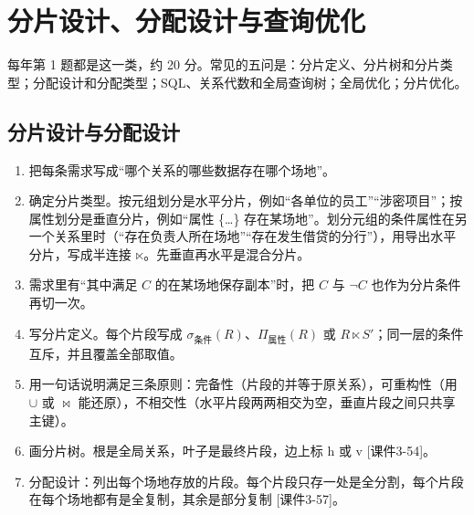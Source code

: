 \documentclass[10pt,a4paper]{article}
\newcommand{\sj}{\ltimes}
\newcommand{\jn}{\bowtie}
\newcommand{\sel}[1]{\sigma_{\text{#1}}}
\newcommand{\proj}[1]{\Pi_{\text{#1}}}
\newcommand{\kj}[1]{\textsf{\small[课件#1]}}
\begin{document}
\clearpage
\section{分片设计、分配设计与查询优化}
{\small 每年第 1 题都是这一类，约 20 分。常见的五问是：分片定义、分片树和分片类型；分配设计和分配类型；SQL、关系代数和全局查询树；全局优化；分片优化。}

\subsection{分片设计与分配设计}\label{s:frag}
\begin{flow}[分片与分配设计的步骤]
\begin{enumerate}
\item 把每条需求写成“哪个关系的哪些数据存在哪个场地”。
\item 确定分片类型。按元组划分是水平分片，例如“各单位的员工”“涉密项目”；按属性划分是垂直分片，例如“属性 \{…\} 存在某场地”。划分元组的条件属性在另一个关系里时（“存在负责人所在场地”“存在发生借贷的分行”），用导出水平分片，写成半连接 $\sj$。先垂直再水平是混合分片。
\item 需求里有“其中满足 $C$ 的在某场地保存副本”时，把 $C$ 与 $\neg C$ 也作为分片条件再切一次。
\item 写分片定义。每个片段写成 $\sel{条件}(R)$、$\proj{属性}(R)$ 或 $R\sj S'$；同一层的条件互斥，并且覆盖全部取值。
\item 用一句话说明满足三条原则：完备性（片段的并等于原关系），可重构性（用 $\cup$ 或 $\jn$ 能还原），不相交性（水平片段两两相交为空，垂直片段之间只共享主键）。
\item 画分片树。根是全局关系，叶子是最终片段，边上标 h 或 v \kj{3-54}。
\item 分配设计：列出每个场地存放的片段。每个片段只存一处是全分割，每个片段在每个场地都有是全复制，其余是部分复制 \kj{3-57}。
\end{enumerate}
\end{flow}
\end{document}
